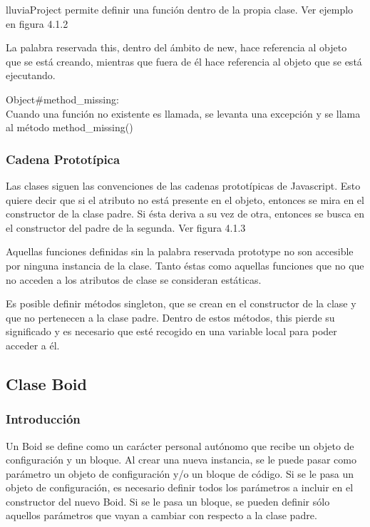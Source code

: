 lluviaProject permite definir una función dentro de la propia clase. Ver ejemplo en figura 4.1.2

La palabra reservada this, dentro del ámbito de new, hace referencia al objeto que se está creando, mientras que fuera de él hace 
referencia al objeto que se está ejecutando. 

Object\#method\_missing:\\

Cuando una función no existente es llamada, se levanta una excepción y se llama al método method\_missing()



\subsubsection{Cadena Prototípica}
\label{subsubsection:prototipos}

Las clases siguen las convenciones de las cadenas prototípicas de Javascript. Esto quiere decir que si el atributo no está presente en el 
objeto, entonces se mira en el constructor de la clase padre. Si ésta deriva a su vez de otra, entonces se busca en el constructor del 
padre de la segunda. Ver figura 4.1.3

Aquellas funciones definidas sin la palabra reservada prototype no son accesible por ninguna instancia de la clase. Tanto éstas como aquellas 
funciones que no que no acceden a los atributos de clase se consideran estáticas.

Es posible definir métodos singleton, que se crean en el constructor de la clase y que no pertenecen a la clase padre. Dentro de estos 
métodos, this pierde su significado y es necesario que esté recogido en una variable local para poder acceder a él.\\



\subsection{Clase Boid}
\label{subsection:boid}

\subsubsection{Introducción}
\label{subsubsection:boid_general}

Un Boid se define como un carácter personal autónomo que recibe un objeto de configuración y un bloque. Al crear una nueva instancia, se 
le puede pasar como parámetro un objeto de configuración y/o un bloque de código. Si se le pasa un objeto de configuración, es necesario 
definir todos los parámetros a incluir en el constructor del nuevo Boid. Si se le pasa un bloque, se pueden definir sólo aquellos parámetros 
que vayan a cambiar con respecto a la clase padre.

